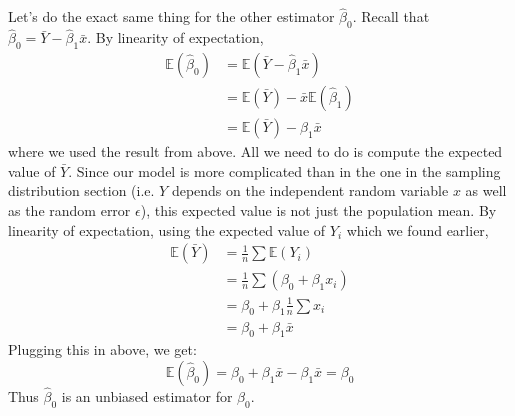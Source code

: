 \documentclass[12pt]{article}
\theoremstyle{definition}
\theoremstyle{remark}
\def\E{{\mathbb E}}
\begin{document}
Let's do the exact same thing for the other estimator $\hat{\beta}_0$. Recall that $\hat{\beta}_0 = \bar{Y} - \hat{\beta}_1 \bar{x}$. By linearity of expectation, 
\begin{align*}
\E( \hat{\beta}_0 ) &= \E( \bar{Y} - \hat{\beta}_1 \bar{x} ) \\
&= \E( \bar{Y} ) - \bar{x} \E( \hat{\beta}_1 ) \\
&= \E( \bar{Y} ) - \beta_1 \bar{x}
\end{align*}
where we used the result from above. All we need to do is compute the expected value of $\bar{Y}$. Since our model is more complicated than in the one in the sampling distribution section (i.e. $Y$ depends on the independent random variable $x$ as well as the random error $\epsilon$), this expected value is not just the population mean. By linearity of expectation, using the expected value of $Y_i$ which we found earlier,
\begin{align*}
\E(\bar{Y}) &= \frac{1}{n} \sum \E(Y_i) \\
&= \frac{1}{n} \sum ( \beta_0 + \beta_1 x_i ) \\
&= \beta_0 + \beta_1 \frac{1}{n} \sum x_i \\
&= \beta_0 + \beta_1 \bar{x}
\end{align*}
Plugging this in above, we get:
\[
\E( \hat{\beta}_0 ) = \beta_0 + \beta_1 \bar{x} - \beta_1 \bar{x} = \beta_0
\]
Thus $\hat{\beta}_0$ is an unbiased estimator for $\beta_0$.\\
\end{document}
